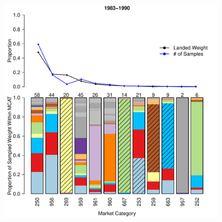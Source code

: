 \documentclass[12pt]{article}
\begin{document}
%
\clearpage
%

\begin{landscape}
\begin{figure}[h!]
\centering
\vspace{-1.2cm}
\includegraphics[height=\textheight]{./pictures/1983to1990Bar3.pdf}

\end{figure}
\end{landscape}
\end{document}
